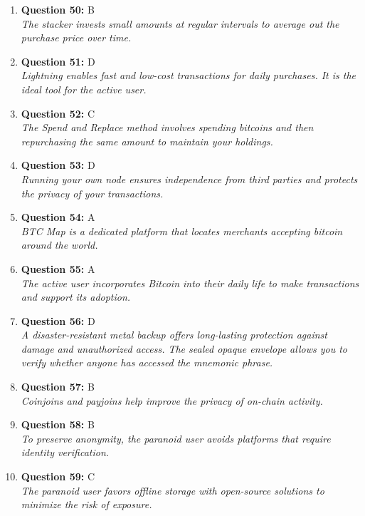 \documentclass[12pt,a4paper]{article}
\begin{document}
\begin{enumerate}
\item \textbf{Question 50:} B
\\ \textit{The stacker invests small amounts at regular intervals to average out the purchase price over time.}

\item \textbf{Question 51:} D
\\ \textit{Lightning enables fast and low-cost transactions for daily purchases. It is the ideal tool for the active user.}

\item \textbf{Question 52:} C
\\ \textit{The Spend and Replace method involves spending bitcoins and then repurchasing the same amount to maintain your holdings.}

\item \textbf{Question 53:} D
\\ \textit{Running your own node ensures independence from third parties and protects the privacy of your transactions.}

\item \textbf{Question 54:} A
\\ \textit{BTC Map is a dedicated platform that locates merchants accepting bitcoin around the world.}

\item \textbf{Question 55:} A
\\ \textit{The active user incorporates Bitcoin into their daily life to make transactions and support its adoption.}

\item \textbf{Question 56:} D
\\ \textit{A disaster-resistant metal backup offers long-lasting protection against damage and unauthorized access. The sealed opaque envelope allows you to verify whether anyone has accessed the mnemonic phrase.}

\item \textbf{Question 57:} B
\\ \textit{Coinjoins and payjoins help improve the privacy of on-chain activity.}

\item \textbf{Question 58:} B
\\ \textit{To preserve anonymity, the paranoid user avoids platforms that require identity verification.}

\item \textbf{Question 59:} C
\\ \textit{The paranoid user favors offline storage with open-source solutions to minimize the risk of exposure.}


\end{enumerate}
\end{document}
